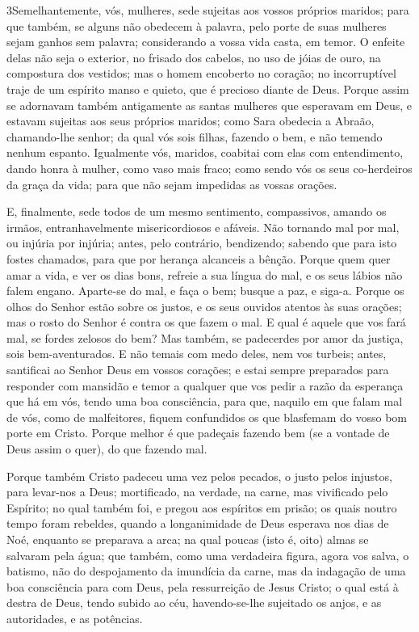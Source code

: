 \medskip

\lettrine{3} Semelhantemente, vós, mulheres, sede sujeitas aos
vossos próprios maridos; para que também, se alguns não obedecem à
palavra, pelo porte de suas mulheres sejam ganhos sem palavra;
considerando a vossa vida casta, em temor. O enfeite delas
não seja o exterior, no frisado dos cabelos, no uso de jóias de
ouro, na compostura dos vestidos; mas o homem encoberto no
coração; no incorruptível traje de um espírito manso e quieto, que é
precioso diante de Deus. Porque assim se adornavam também
antigamente as santas mulheres que esperavam em Deus, e estavam
sujeitas aos seus próprios maridos; como Sara obedecia a Abraão,
chamando-lhe senhor; da qual vós sois filhas, fazendo o bem, e não
temendo nenhum espanto. Igualmente vós, maridos, coabitai com
elas com entendimento, dando honra à mulher, como vaso mais fraco;
como sendo vós os seus co-herdeiros da graça da vida; para que não
sejam impedidas as vossas orações.

E, finalmente, sede todos de um mesmo sentimento, compassivos,
amando os irmãos, entranhavelmente misericordiosos e afáveis.
Não tornando mal por mal, ou injúria por injúria; antes, pelo
contrário, bendizendo; sabendo que para isto fostes chamados, para
que por herança alcanceis a bênção. Porque quem quer amar a
vida, e ver os dias bons, refreie a sua língua do mal, e os seus
lábios não falem engano. Aparte-se do mal, e faça o bem;
busque a paz, e siga-a. Porque os olhos do Senhor estão sobre
os justos, e os seus ouvidos atentos às suas orações; mas o rosto do
Senhor é contra os que fazem o mal. E qual é aquele que vos
fará mal, se fordes zelosos do bem? Mas também, se padecerdes
por amor da justiça, sois bem-aventurados. E não temais com medo
deles, nem vos turbeis; antes, santificai ao Senhor Deus em
vossos corações; e estai sempre preparados para responder com
mansidão e temor a qualquer que vos pedir a razão da esperança que
há em vós, tendo uma boa consciência, para que, naquilo em
que falam mal de vós, como de malfeitores, fiquem confundidos os que
blasfemam do vosso bom porte em Cristo. Porque melhor é que
padeçais fazendo bem (se a vontade de Deus assim o quer), do que
fazendo mal.

Porque também Cristo padeceu uma vez pelos pecados, o justo pelos
injustos, para levar-nos a Deus; mortificado, na verdade, na carne,
mas vivificado pelo Espírito; no qual também foi, e pregou
aos espíritos em prisão; os quais noutro tempo foram
rebeldes, quando a longanimidade de Deus esperava nos dias de Noé,
enquanto se preparava a arca; na qual poucas (isto é, oito) almas se
salvaram pela água; que também, como uma verdadeira figura,
agora vos salva, o batismo, não do despojamento da imundícia da
carne, mas da indagação de uma boa consciência para com Deus, pela
ressurreição de Jesus Cristo; o qual está à destra de Deus,
tendo subido ao céu, havendo-se-lhe sujeitado os anjos, e as
autoridades, e as potências.

